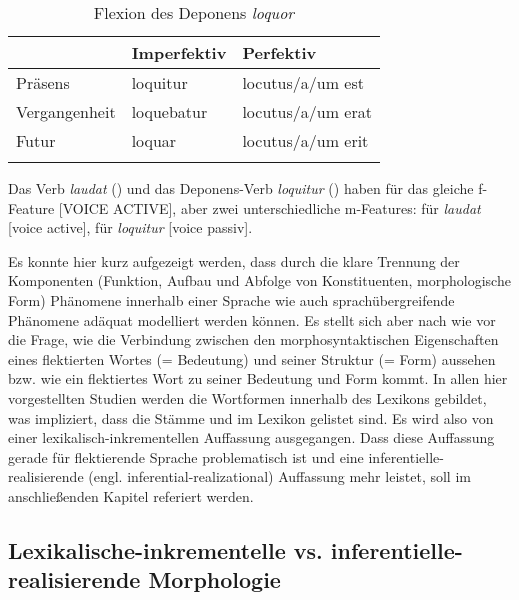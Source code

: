 
\begin{table}
\caption{Flexion des Deponens \textit{loquor} {\citep[75]{SadlerSpencer2001}}}\label{table4.2}
\begin{tabularx}{\textwidth}{XXX}
\lsptoprule
 & {Imperfektiv} & {Perfektiv}\\\midrule
{Präsens} & loquitur & locutus/a/um est\\
{Vergangenheit} & loquebatur & locutus/a/um erat\\
{Futur} & loquar & locutus/a/um erit\\
\lspbottomrule
\end{tabularx}
\end{table}

Das Verb \textit{laudat} () und das Deponens-Verb \textit{loquitur} () haben für das gleiche f-Feature [VOICE ACTIVE], aber zwei unterschiedliche m-Features: für \textit{laudat} [voice active], für \textit{loquitur} [voice passiv].

Es konnte hier kurz aufgezeigt werden, dass durch die klare Trennung der Komponenten (Funktion, Aufbau und Abfolge von Konstituenten, morphologische Form) Phänomene innerhalb einer Sprache wie auch sprachübergreifende Phänomene adäquat modelliert werden können. Es stellt sich aber nach wie vor die Frage, wie die Verbindung zwischen den morphosyntaktischen Eigenschaften eines flektierten Wortes (= Bedeutung) und seiner Struktur (= Form) aussehen bzw. wie ein flektiertes Wort zu seiner Bedeutung und Form kommt. In allen hier vorgestellten Studien werden die Wortformen innerhalb des Lexikons gebildet, was impliziert, dass die Stämme und  im Lexikon gelistet sind. Es wird also von einer le\-xi\-ka\-lisch-in\-kre\-men\-tel\-len Auffassung ausgegangen. Dass diese Auffassung gerade für flektierende Sprache problematisch ist und eine in\-fe\-ren\-tiel\-le-re\-a\-li\-sie\-ren\-de (engl. inferential-realizational) Auffassung mehr leistet, soll im anschließenden Kapitel referiert werden.

\subsection{Lexikalische-inkrementelle vs. in\-fe\-ren\-tiel\-le-re\-a\-li\-sie\-ren\-de Morphologie}\label{4.1.2}

